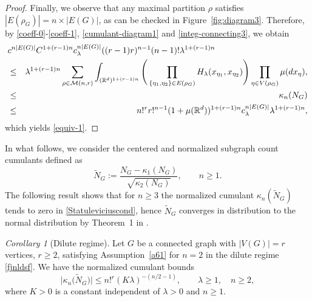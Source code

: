 \documentclass[bj,authoryear,noshowframe]{imsart}
\theoremstyle{plain}
\theoremstyle{remark}
\newcommand{\R}{\mathbb{R}}
\def\real{{\mathord{\mathbb R}}}
\newtheorem{corollary}[prop]{Corollary}
\begin{document}
\begin{proof}
\vspace{-0.5cm} 

\noindent
 Finally, we observe that any maximal partition $\rho$ satisfies
$|E(\rho_G)|=n\times|E(G)|$, 
as can be checked in Figure~\ref{fig:diagram3}.
 Therefore, by %
 \eqref{coeff-0}-\eqref{coeff-1},
 \eqref{cumulant-diagram1} and \eqref{integ-connecting3}, we obtain 
\begin{eqnarray*} 
  \lefteqn{
    c^{n|E(G)|}
    C^{1+(r-1)n}
    c_\lambda^{n|E(G)|}
    ( (r-1)r )^{n-1}(n-1)!
    \lambda^{1+(r-1)n}
  }
  \\
   & \leq &   
    \lambda^{1+(r-1)n}
  \sum_{\rho\in\mathcal{M}(n,r)}\int_{(\R^d)^{1+(r-1)n}}
  \Bigg(
  \prod_{\{\eta_1,\eta_2\}\in E(\rho_G)}H_\lambda(x_{\eta_1},x_{\eta_2})
  \Bigg)
  \prod_{\eta\in V(\rho_G)}\mu(dx_{\eta}),
  \\
   & \leq &     \kappa_n(N_G)
      \\
  & \leq & 
  n!^r r!^{n-1} 
  ( 1 + \mu ( \real^d))^{1+(r-1)n}
  c_\lambda^{n|E(G)|}
 \lambda^{1+(r-1)n}, 
\end{eqnarray*}
which yields \eqref{equiv-1}.
\end{proof}
 In what follows, we consider the centered and normalized subgraph count cumulants defined as 
 $$
 \widetilde{N}_G
 := \frac{N_G - \kappa_1 (N_G)}{\sqrt{\kappa_2(N_G)}}, \qquad n \geq 1. 
$$
 The following result shows that for $n\geq 3$ the normalized cumulant
 $\kappa_n(\widetilde{N}_G)$ tends to zero in \eqref{Statuleviciuscond},
 hence $\widetilde{N}_G$ converges in distribution to the normal
 distribution by Theorem~1 in \cite{Janson1988}.   
\begin{corollary}[Dilute regime]
\label{t1-c}
Let $G$ be a connected graph with $|V(G)| = r$ vertices, $r\geq 2$, 
satisfying Assumption~\ref{a61} for $n=2$ in the dilute regime \eqref{fjnldsf}. 
  We have the normalized cumulant bounds 
 \begin{equation}
    \label{Statuleviciuscond}
  \big|\kappa_n \big(\widetilde{N}_G\big)\big|
  \leq n!^r ( K \lambda )^{-(n/2-1)},
  \qquad \lambda \geq 1, \quad n\geq 2,
\end{equation}
where $K>0$ is a constant independent of $\lambda >0$ and $n\geq 1$.
\end{corollary}
\end{document}
